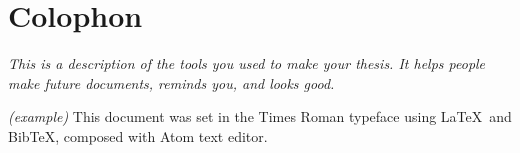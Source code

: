 \chapter{Colophon}
\label{appendixlabel3}
\textit{This is a description of the tools you used to make your thesis. It helps people make future documents, reminds you, and looks good.}

\textit{(example)} This document was set in the Times Roman typeface using \LaTeX\ and Bib\TeX , composed with Atom text editor.

